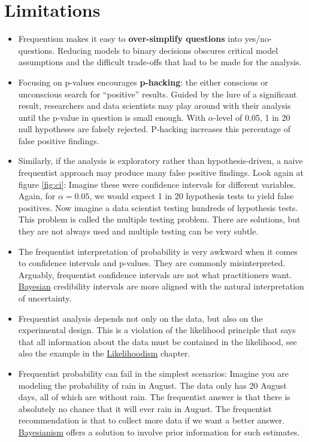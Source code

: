 \documentclass[
  10pt,
]{scrbook}
\providecommand{\tightlist}{%
  \setlength{\itemsep}{0pt}\setlength{\parskip}{0pt}}
\begin{document}
\hypertarget{limitations-1}{%
\section{Limitations}\label{limitations-1}}

\begin{itemize}
\tightlist
\item
  Frequentism makes it easy to \textbf{over-simplify questions} into yes/no-questions. Reducing models to binary decisions obscures critical model assumptions and the difficult trade-offs that had to be made for the analysis.
\item
  Focusing on p-values encourages \textbf{p-hacking}: the either conscious or unconscious search for ``positive'' results. Guided by the lure of a significant result, researchers and data scientists may play around with their analysis until the p-value in question is small enough. With \(\alpha\)-level of 0.05, 1 in 20 null hypotheses are falsely rejected. P-hacking increases this percentage of false positive findings.
\item
  Similarly, if the analysis is exploratory rather than hypothesis-driven, a naive frequentist approach may produce many false positive findings. Look again at figure \ref{fig:ci}: Imagine these were confidence intervals for different variables. Again, for \(\alpha = 0.05\), we would expect 1 in 20 hypothesis tests to yield false positives. Now imagine a data scientist testing hundreds of hypothesis tests. This problem is called the multiple testing problem. There are solutions, but they are not always used and multiple testing can be very subtle.
\item
  The frequentist interpretation of probability is very awkward when it comes to confidence intervals and p-values. They are commonly misinterpreted. Arguably, frequentist confidence intervals are not what practitioners want. \protect\hyperlink{bayesian-inference}{Bayesian} credibility intervals are more aligned with the natural interpretation of uncertainty.
\item
  Frequentist analysis depends not only on the data, but also on the experimental design. This is a violation of the likelihood principle that says that all information about the data must be contained in the likelihood, see also the example in the \protect\hyperlink{likelihoodism}{Likelihoodism} chapter.
\item
  Frequentist probability can fail in the simplest scenarios: Imagine you are modeling the probability of rain in August. The data only has 20 August days, all of which are without rain. The frequentist answer is that there is absolutely no chance that it will ever rain in August. The frequentist recommendation is that to collect more data if we want a better answer. \protect\hyperlink{bayesian-inference}{Bayesianism} offers a solution to involve prior information for such estimates.

\end{itemize}
\end{document}
